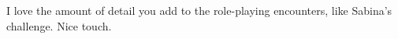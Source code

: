 I love the amount of detail you add to the role-playing encounters, like Sabina's challenge. Nice touch.\\

